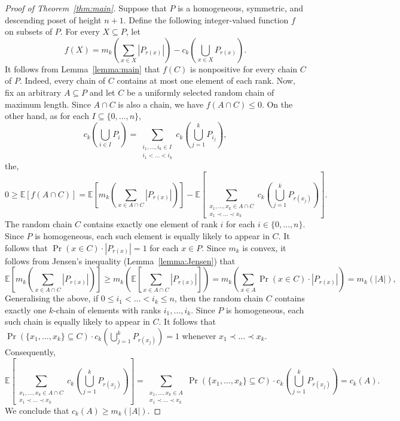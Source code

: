 \documentclass[11pt,a4paper,reqno]{amsart}
\numberwithin{claim}{thm}
\theoremstyle{definition}
\newcommand{\Ex}{\mathbb{E}}
\renewcommand{\le}{\leqslant}
\renewcommand{\ge}{\geqslant}
\begin{document}
\begin{proof}[Proof of Theorem~\ref{thm:main}]
  Suppose that $P$ is a homogeneous, symmetric, and descending poset of height $n+1$. Define the following integer-valued function $f$ on subsets of $P$. For every $X \subseteq P$, let
  \[
    f(X) = m_k\left( \sum_{x \in X} |P_{r(x)}|\right) - c_k\left( \bigcup_{x \in X} P_{r(x)}\right).
  \]
  It follows from Lemma~\ref{lemma:main} that $f(C)$ is nonpositive for every chain $C$ of $P$. Indeed, every chain of $C$ contains at most one element of each rank. Now, fix an arbitrary $A \subseteq P$ and let $C$ be a uniformly selected random chain of maximum length. Since $A \cap C$ is also a chain, we have $f(A \cap C) \le 0$. On the other hand, as for each $I \subseteq \{0, \dotsc, n\}$,
  \[
    c_k\left( \bigcup_{i \in I} P_i \right) = \sum_{\substack{i_1, \dotsc, i_k \in I \\ i_1 < \dotsc < i_k}} c_k\left( \bigcup_{j = 1}^k P_{i_j} \right),
  \]
  the,
  \begin{equation}
    \label{eq:nonnegativity}
    0 \ge \Ex[f(A \cap C)] = \Ex\left[m_k\left(\sum_{x \in A \cap C} |P_{r(x)}| \right)\right] - \Ex\left[ \sum_{\substack{x_1, \dotsc, x_k \in A \cap C \\ x_1 \prec \dotsc \prec x_k}} c_k\left(\bigcup_{j=1}^k P_{r(x_j)} \right) \right].
  \end{equation}
  The random chain $C$ contains exactly one element of rank $i$ for each $i \in \{0, \dotsc, n\}$. Since $P$ is homogeneous, each such element is equally likely to appear in $C$. It follows that $\Pr(x \in C) \cdot |P_{r(x)}| = 1$ for each $x \in P$.  Since $m_k$ is convex, it follows from Jensen's inequality (Lemma~\ref{lemma:Jensen}) that
  \begin{equation}
    \label{eq:Jensen}
    \Ex\left[m_k\left(\sum_{x \in A \cap C} |P_{r(x)}| \right)\right] \ge m_k\left(   \Ex\left[\sum_{x \in A \cap C} |P_{r(x)}| \right]  \right) = m_k\left( \sum_{x \in A} \Pr(x \in C) \cdot |P_{r(x)}|\right) = m_k(|A|),
  \end{equation}
  Generalising the above, if $0 \le i_1 < \dotsc < i_k \le n$, then the random chain $C$ contains exactly one $k$-chain of elements with ranks $i_1, \dotsc, i_k$. Since $P$ is homogeneous, each such chain is equally likely to appear in $C$. It follows that $\Pr(\{x_1, \dotsc, x_k\} \subseteq C) \cdot c_k\left(\bigcup_{j=1}^k P_{r(x_j)} \right) = 1$ whenever $x_1 \prec \dotsc \prec x_k$. Consequently,
  \[
    \Ex\left[ \sum_{\substack{x_1, \dotsc, x_k \in A \cap C \\ x_1 \prec \dotsc \prec x_k}} c_k\left(\bigcup_{j=1}^k P_{r(x_j)} \right) \right] = \sum_{\substack{x_1, \dotsc, x_k \in A \\ x_1 \prec \dotsc \prec x_k}} \Pr(\{x_1, \dotsc, x_k\} \subseteq C) \cdot c_k\left(\bigcup_{j=1}^k P_{r(x_j)} \right) = c_k(A).
  \]
  We conclude that $c_k(A) \ge m_k(|A|)$.


\end{proof}
\end{document}
